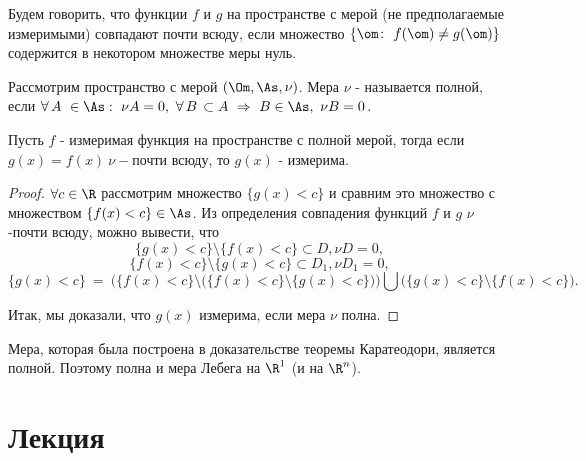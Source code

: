 \documentclass[a4paper]{article}
\newcommand{\mro} {\R^1}
\begin{document}
Будем говорить, что функции $f$ и $g$ на пространстве с мерой (не
предполагаемые измеримыми) совпадают почти всюду, если множество
$\{\om \colon \ f(\om)\not = g (\om)\}$ содержится в некотором
множестве меры нуль.

\begin{df}
Рассмотрим пространство с мерой $(\Om, \As, \nu)$. Мера
$\nu$ - называется полной, если  $\forall\, A \ \in \As
:\  \nu A =0,\ \forall\, B\, \subset A \ \Rightarrow \ B \in
\As, \ \nu B =0$.
\end{df}
\begin{prop}
Пусть $f$ - измеримая функция на пространстве с полной мерой,
тогда если $g(x)=f(x) \ \nu-$почти всюду, то $g(x)$ - измерима.
\end{prop}

\begin{proof}
$\forall c \in\R$ рассмотрим множество $\{g(x)< c\}$ и
сравним это множество с множеством $\{f(x)< c\} \in \As$. Из
определения совпадения функций $f$ и $g$ $\nu$-почти всюду, можно
вывести, что
$$\{ g(x)<c\}\setminus \{ f(x)<c \} \subset D, \nu D =0,$$ $$\{
f(x)<c\}\setminus \{ g(x)<c \} \subset D_1, \nu D_1 =0,$$
$$\{ g(x)
< c \} \ = \ \bigl( \{f(x) <c \}\setminus \bigl(\{f(x)
<c\}\setminus \{g(x)<c\} \bigr)\bigr)\bigcup \bigl( \{ g(x) < c\}
\setminus \{f(x) <c \} \bigr).$$

Итак, мы доказали, что $g(x)$ измерима, если мера $\nu$ полна.

\end{proof}
\begin{ex}
Мера, которая была построена в доказательстве теоремы Каратеодори,
является полной. Поэтому полна и мера Лебега на $\mro$ (и на
$\R^n$).
\end{ex}

\section{Лекция}
\end{document}

